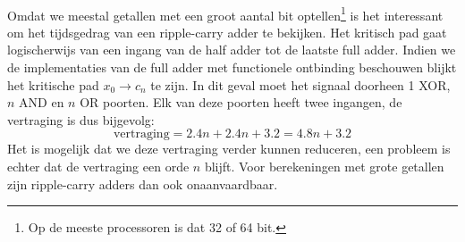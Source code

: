 \paragraph{}
Omdat we meestal getallen met een groot aantal bit optellen\footnote{Op de meeste processoren is dat 32 of 64 bit.} is het interessant om het tijdsgedrag van een ripple-carry adder te bekijken. Het kritisch pad gaat logischerwijs van een ingang van de half adder tot de laatste full adder. Indien we de implementaties van de full adder met functionele ontbinding beschouwen blijkt het kritische pad $x_0\rightarrow c_n$ te zijn. In dit geval moet het signaal doorheen 1 XOR, $n$ AND en $n$ OR poorten. Elk van deze poorten heeft twee ingangen, de vertraging is dus bijgevolg:
\begin{equation}
\mbox{vertraging}=2.4n+2.4n+3.2=4.8n+3.2
\end{equation}
Het is mogelijk dat we deze vertraging verder kunnen reduceren, een probleem is echter dat de vertraging een orde $n$ blijft. Voor berekeningen met grote getallen zijn ripple-carry adders dan ook onaanvaardbaar.
